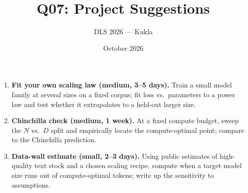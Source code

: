 \documentclass[11pt]{article}
\title{Q07: Project Suggestions}
\author{DLS 2026 --- Kukla}
\date{October 2026}
\begin{document}
\maketitle
\begin{enumerate}[leftmargin=1.5em]
\item \textbf{Fit your own scaling law (medium, 3--5 days).} Train a small model family at several sizes on a fixed corpus; fit loss vs.\ parameters to a power law and test whether it extrapolates to a held-out larger size.
\item \textbf{Chinchilla check (medium, 1 week).} At a fixed compute budget, sweep the $N$ vs.\ $D$ split and empirically locate the compute-optimal point; compare to the Chinchilla prediction.
\item \textbf{Data-wall estimate (small, 2--3 days).} Using public estimates of high-quality text stock and a chosen scaling recipe, compute when a target model size runs out of compute-optimal tokens; write up the sensitivity to assumptions.
\end{enumerate}
\end{document}
